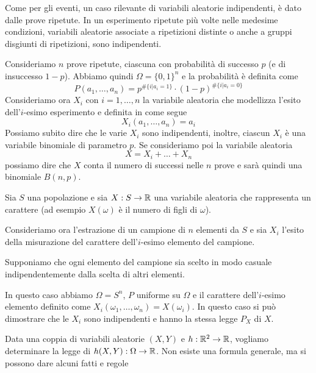 Come per gli eventi, un caso rilevante di variabili aleatorie indipendenti, è dato dalle prove
ripetute. In un esperimento ripetute più volte nelle medesime condizioni, variabili aleatorie
associate a ripetizioni distinte o anche a gruppi disgiunti di ripetizioni, sono indipendenti.

\begin{example}
	Consideriamo $n$ prove ripetute, ciascuna con probabilità di successo $p$ (e di insuccesso
	$1-p$). Abbiamo quindi $\Omega = \{0,1\}^n$ e la probabilità è definita come
	\[ P(a_1, \dots, a_n) = p^{\# \{i | a_i = 1\}} \cdot (1-p)^{\# \{i | a_i = 0\}} \]
	Consideriamo ora $X_i$ con $i = 1, \dots, n$ la variabile aleatoria che modellizza l'esito
	dell'$i$-esimo esperimento e definita in come segue
	\[ X_i (a_1, \dots, a_n) = a_i \]
	Possiamo subito dire che le varie $X_i$ sono indipendenti, inoltre, ciascun $X_i$ è una
	variabile binomiale di parametro $p$. Se consideriamo poi la variabile aleatoria
	\[ X = X_i + \dots + X_n \]
	possiamo dire che $X$ conta il numero di successi nelle $n$ prove e sarà quindi una binomiale
	$B(n,p)$.
\end{example}

\begin{example}
	Sia $S$ una popolazione e sia $X : S \to \mathbb{R}$ una variabile aleatoria che rappresenta un
	carattere (ad esempio $X(\omega)$ è il numero di figli di $\omega$).

	Consideriamo ora l'estrazione di un campione di $n$ elementi da $S$ e sia $X_i$ l'esito della
	misurazione del carattere dell'$i$-esimo elemento del campione.

	Supponiamo che ogni elemento del campione sia scelto in modo casuale indipendentemente dalla
	scelta di altri elementi.

	In questo caso abbiamo $\Omega = S^n$, $P$ uniforme su $\Omega$ e il carattere dell'$i$-esimo
	elemento definito come $X_i(\omega_1, \dots, \omega_n) = X (\omega_i)$. In questo caso si può
	dimostrare che le $X_i$ sono indipendenti e hanno la stessa legge $P_X$ di $X$.
\end{example}

Data una coppia di variabili aleatorie $(X, Y)$ e $h : \mathbb{R}^2 \to \mathbb{R}$, vogliamo determinare la legge
di $h(X, Y) : \Omega \to \mathbb{R}$. Non esiste una formula generale, ma si possono dare alcuni fatti e
regole

